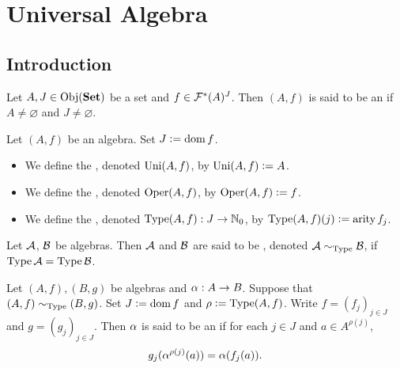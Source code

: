 \documentclass{book}
\begin{document}
	
	
	
	
	
	
	
	
	
	
	
	
	
	
	
	
	
	
	
	\newpage
	\chapter{Universal Algebra}
	
	\section{Introduction}
	
	\begin{defn}
		Let $A,J \in \operatorname{Obj}(\operatorname*{\text{\textbf{Set}}})$ be a set and $f \in \mathcal{F}^*(A)^J$. Then $(A, f)$ is said to be an  if $A \neq \varnothing$ and $J \neq \varnothing$. 
	\end{defn}
	
	\begin{defn}
		Let $(A, f)$ be an algebra. Set $J \vcentcolon= \operatorname{dom} f$. 
		\begin{itemize}
			\item We define the , denoted $\operatorname{Uni}(A, f)$, by $\operatorname{Uni}(A, f) \vcentcolon= A$.
			\item We define the , denoted $\operatorname{Oper}(A, f)$, by $\operatorname{Oper}(A, f) \vcentcolon= f$.
			\item We define the , denoted $\operatorname{Type}(A, f): J \rightarrow \mathbb{N}_0$, by $\operatorname{Type}(A, f)(j) \vcentcolon= \operatorname*{\text{arity}} f_j$.
		\end{itemize}
	\end{defn}

	\begin{defn}
		Let $\mathcal{A}$, $\mathcal{B}$ be algebras. Then $\mathcal{A}$ and $\mathcal{B}$ are said to be , denoted $\mathcal{A} \sim_{\operatorname{Type}} \mathcal{B}$, if $\operatorname{Type} \mathcal{A} = \operatorname{Type} \mathcal{B}$.
	\end{defn}
	
	\begin{defn}
		Let $(A, f), (B, g)$ be algebras and $\alpha:A \rightarrow B$. Suppose that $(A, f) \sim_{\operatorname{Type}} (B, g)$. Set $J \vcentcolon= \operatorname{dom} f$ and $\rho \vcentcolon= \operatorname{Type}(A, f)$. Write $f = (f_j)_{j \in J}$ and $g = (g_j)_{j \in J}$. Then $\alpha$ is said to be an  if for each $j \in J$ and $a \in A^{\rho(j)}$, 
		$$g_j(\alpha^{\rho(j)}(a)) = \alpha(f_j(a)).$$
	\end{defn}
	
\end{document}
